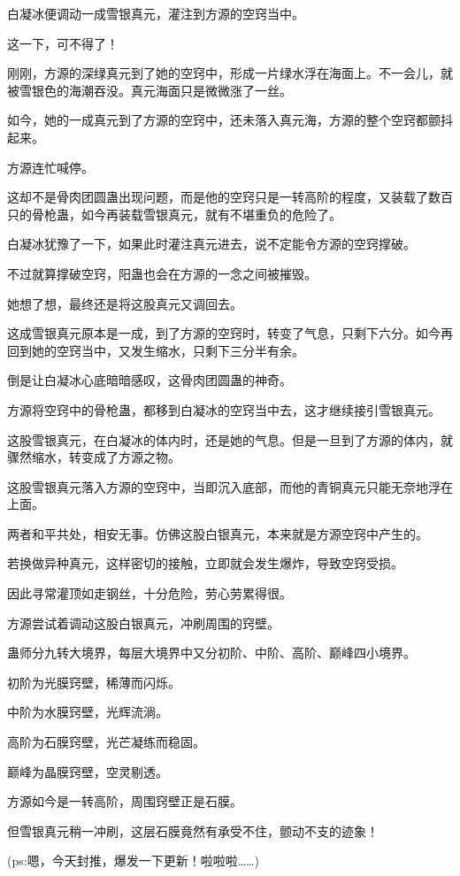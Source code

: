 \begin{this_body}
白凝冰便调动一成雪银真元，灌注到方源的空窍当中。

这一下，可不得了！

刚刚，方源的深绿真元到了她的空窍中，形成一片绿水浮在海面上。不一会儿，就被雪银色的海潮吞没。真元海面只是微微涨了一丝。

如今，她的一成真元到了方源的空窍中，还未落入真元海，方源的整个空窍都颤抖起来。

方源连忙喊停。

这却不是骨肉团圆蛊出现问题，而是他的空窍只是一转高阶的程度，又装载了数百只的骨枪蛊，如今再装载雪银真元，就有不堪重负的危险了。

白凝冰犹豫了一下，如果此时灌注真元进去，说不定能令方源的空窍撑破。

不过就算撑破空窍，阳蛊也会在方源的一念之间被摧毁。

她想了想，最终还是将这股真元又调回去。

这成雪银真元原本是一成，到了方源的空窍时，转变了气息，只剩下六分。如今再回到她的空窍当中，又发生缩水，只剩下三分半有余。

倒是让白凝冰心底暗暗感叹，这骨肉团圆蛊的神奇。

方源将空窍中的骨枪蛊，都移到白凝冰的空窍当中去，这才继续接引雪银真元。

这股雪银真元，在白凝冰的体内时，还是她的气息。但是一旦到了方源的体内，就骤然缩水，转变成了方源之物。

这股雪银真元落入方源的空窍中，当即沉入底部，而他的青铜真元只能无奈地浮在上面。

两者和平共处，相安无事。仿佛这股白银真元，本来就是方源空窍中产生的。

若换做异种真元，这样密切的接触，立即就会发生爆炸，导致空窍受损。

因此寻常灌顶如走钢丝，十分危险，劳心劳累得很。

方源尝试着调动这股白银真元，冲刷周围的窍壁。

蛊师分九转大境界，每层大境界中又分初阶、中阶、高阶、巅峰四小境界。

初阶为光膜窍壁，稀薄而闪烁。

中阶为水膜窍壁，光辉流淌。

高阶为石膜窍壁，光芒凝练而稳固。

巅峰为晶膜窍壁，空灵剔透。

方源如今是一转高阶，周围窍壁正是石膜。

但雪银真元稍一冲刷，这层石膜竟然有承受不住，颤动不支的迹象！

(ps:嗯，今天封推，爆发一下更新！啦啦啦……)

\end{this_body}

